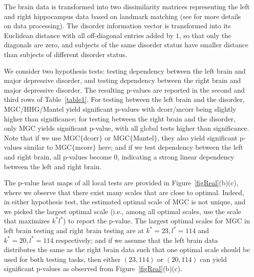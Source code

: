 \documentclass[11pt]{article}
\begin{document}
The brain data is transformed into two dissimilarity matrices representing the left and right hippocampus data based on landmark matching (see \cite{ParkEtAl2011} for more details on data processing). The disorder information vector is transformed into its Euclidean distance with all off-diagonal entries added by $1$, so that only the diagonals are zero, and subjects of the same disorder status have smaller distance than subjects of different disorder status.

We consider two hypothesis tests: testing dependency between the left brain and major depressive disorder, and testing dependency between the right brain and major depressive disorder. The resulting p-values are reported in the second and third rows of Table~\ref{table1}. For testing between the left brain and the disorder, MGC/HHG/Mantel yield significant p-values with dcorr/mcorr being slightly higher than significance; for testing between the right brain and the disorder, only MGC yields significant p-value, with all global tests higher than significance. Note that if we use MGC$\{$dcorr$\}$ or MGC$\{$Mantel$\}$, they also yield significant p-values similar to MGC$\{$mcorr$\}$ here; and if we test dependency between the left and right brain, all p-values become $0$, indicating a strong linear dependency between the left and right brain.

The p-value heat maps of all local tests are provided in Figure~\ref{figReal}(b)(c), where we observe that there exist many scales that are close to optimal. Indeed, in either hypothesis test, the estimated optimal scale of MGC is not unique, and we picked the largest optimal scale (i.e., among all optimal scales, use the scale that maximizes $k^{*}l^{*}$) to report the p-value. The largest optimal scales for MGC in left brain testing and right brain testing are at $k^{*}=23,l^{*}=114$ and $k^{*}=20,l^{*}=114$ respectively; and if we assume that the left brain data distributes the same as the right brain data such that one optimal scale should be used for both testing tasks, then either $(23,114)$ or $(20,114)$ can yield significant p-values as observed from Figure~\ref{figReal}(b)(c).

\end{document}
